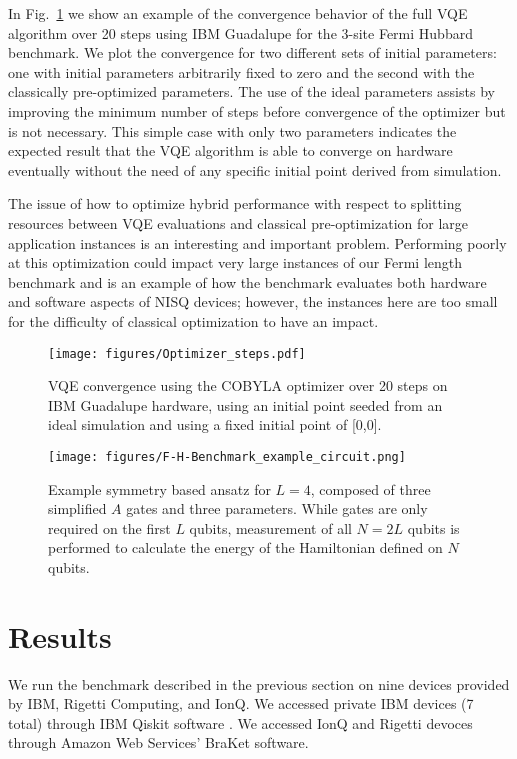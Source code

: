 \documentclass[
prx,
superscriptaddress,
twocolumn,
longbibliography
]{revtex4-1}
\begin{document}
In Fig.~\ref{fig:opt_steps} we show an example of the convergence behavior of the full VQE algorithm over 20 steps using IBM Guadalupe for the 3-site Fermi Hubbard benchmark. We plot the convergence for two different sets of initial parameters: one with initial parameters arbitrarily fixed to zero and the second with the classically pre-optimized parameters. The use of the ideal parameters assists by improving the minimum number of steps before convergence of the optimizer but is not necessary. This simple case with only two parameters indicates the expected result that the VQE algorithm is able to converge on hardware eventually without the need of any specific initial point derived from simulation. 

The issue of how to optimize hybrid performance with respect to splitting resources between VQE evaluations and classical pre-optimization for large application instances is an interesting and important problem. Performing poorly at this optimization could impact very large instances of our Fermi length benchmark and is an example of how the benchmark evaluates both hardware and software aspects of NISQ devices; however, the instances here are too small for the difficulty of classical optimization to have an impact.

\begin{figure}
    \centering
    \texttt{[image: figures/Optimizer\_steps.pdf]}
    \caption{VQE convergence using the COBYLA optimizer over 20 steps on IBM Guadalupe hardware, using an initial point seeded from an ideal simulation and using a fixed initial point of [0,0].}
    \label{fig:opt_steps}
\end{figure}



\begin{figure}
\texttt{[image: figures/F-H-Benchmark\_example\_circuit.png]}
\caption{Example symmetry based ansatz for $L=4$, composed of three simplified $A$ gates and three parameters. While gates are only required on the first $L$ qubits, measurement of all $N=2L$ qubits is performed to calculate the energy of the Hamiltonian defined on $N$ qubits.}
\label{fig:L4example}
\end{figure}


\section{Results}
\label{sec:Results}
We run the benchmark described in the previous section on nine devices provided by IBM, Rigetti Computing, and IonQ. We accessed private IBM devices (7 total) through IBM Qiskit software \cite{Qiskit}. We accessed IonQ and Rigetti devoces through Amazon Web Services' BraKet software. 
\end{document}
